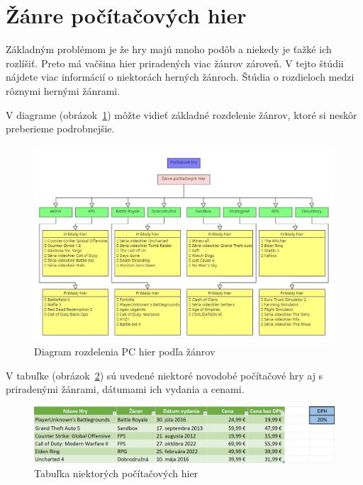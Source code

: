 \documentclass[10pt,oneside,slovak,a4paper]{article}
\begin{document}
\section{Žánre počítačových hier} \label{zanre}

Základným problémom je že hry majú mnoho podôb a niekedy je ťažké ich rozlíšiť. Preto má vačšina hier priradených viac žánrov zároveň. V tejto štúdii nájdete viac informácií o niektorách herných žánroch\cite{9618902}. Štúdia o rozdieloch medzi rôznymi hernými žánrami\cite{4561861}.

V diagrame (obrázok~\ref{f:dia}) môžte vidieť základné rozdelenie žánrov, ktoré si neskôr preberieme podrobnejšie.

\pagebreak

\begin{figure}[h]
\centering
\includegraphics[scale=0.4]{Screenshot_4.jpg}
\caption{Diagram rozdelenia PC hier podľa žánrov}
\label{f:dia}
\end{figure}

V tabuľke (obrázok~\ref{f:tab}) sú uvedené niektoré novodobé počítačové hry aj s priradenými žánrami, dátumami ich vydania a cenami.

\begin{figure}[h]
\centering
\includegraphics[scale=0.315]{tab.jpg}
\caption{Tabuľka niektorých počítačových hier}
\label{f:tab}
\end{figure}
\end{document}
